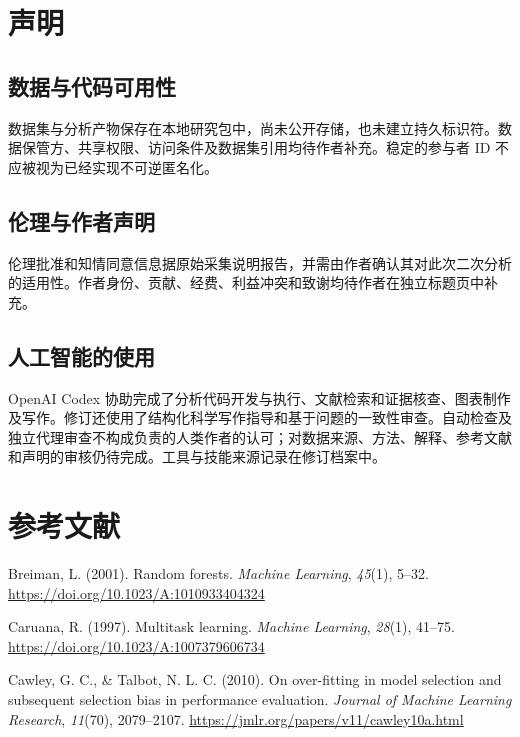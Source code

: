 \documentclass[11pt,letterpaper]{article}
\newcommand{\APAref}{\par\noindent\hangindent=0.5in\hangafter=1\relax}
\begin{document}
\section{声明}\label{ux58f0ux660e}

\subsection{数据与代码可用性}\label{ux6570ux636eux4e0eux4ee3ux7801ux53efux7528ux6027}

数据集与分析产物保存在本地研究包中，尚未公开存储，也未建立持久标识符。数据保管方、共享权限、访问条件及数据集引用均待作者补充。稳定的参与者 ID 不应被视为已经实现不可逆匿名化。

\subsection{伦理与作者声明}\label{ux4f26ux7406ux4e0eux4f5cux8005ux58f0ux660e}

伦理批准和知情同意信息据原始采集说明报告，并需由作者确认其对此次二次分析的适用性。作者身份、贡献、经费、利益冲突和致谢均待作者在独立标题页中补充。

\subsection{人工智能的使用}\label{ux4ebaux5de5ux667aux80fdux7684ux4f7fux7528}

OpenAI Codex 协助完成了分析代码开发与执行、文献检索和证据核查、图表制作及写作。修订还使用了结构化科学写作指导和基于问题的一致性审查。自动检查及独立代理审查不构成负责的人类作者的认可；对数据来源、方法、解释、参考文献和声明的审核仍待完成。工具与技能来源记录在修订档案中。

\fontsize{10.5}{12.8}\selectfont

\FloatBarrier

\section{参考文献}\label{ux53c2ux8003ux6587ux732e}

\APAref Breiman, L. (2001). Random forests. \emph{Machine Learning}, \emph{45}(1), 5--32. \url{https://doi.org/10.1023/A:1010933404324}

\APAref Caruana, R. (1997). Multitask learning. \emph{Machine Learning}, \emph{28}(1), 41--75. \url{https://doi.org/10.1023/A:1007379606734}

\APAref Cawley, G. C., \& Talbot, N. L. C. (2010). On over-fitting in model selection and subsequent selection bias in performance evaluation. \emph{Journal of Machine Learning Research}, \emph{11}(70), 2079--2107. \url{https://jmlr.org/papers/v11/cawley10a.html}
\end{document}
